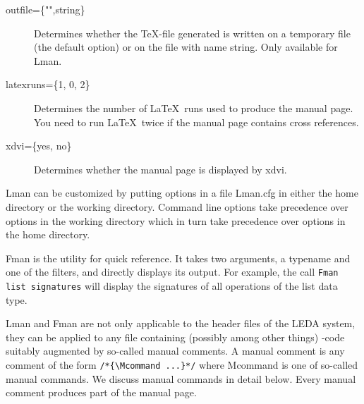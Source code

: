 \begin{description}
\item[outfile=\{"",string\}] Determines whether the \TeX-file generated
is written on a temporary file (the default option) or on the file with name
string. Only available for Lman.

\item[latexruns=\{1, 0, 2\}] Determines the number of \LaTeX\  runs 
used to produce the manual page. You need to run \LaTeX\ twice if the manual
page contains cross references.

\item[xdvi=\{yes, no\}] Determines whether the manual page is 
displayed by xdvi.
\end{description}

Lman can be customized by putting options in a file Lman.cfg in either the home
directory or the working directory. Command line options take precedence over
options in the working directory which in turn take precedence over options in
the home directory.

Fman is the utility for quick reference. It takes two arguments, a typename and
one of the filters, and directly displays its output. For example, the call
\texttt{Fman list signatures} will display the signatures of all operations of
the list data type.

Lman and Fman are not only applicable to the header files of the LEDA system,
they can be applied to any file containing (possibly among other things)
\CCC-code suitably augmented by so-called manual comments. A manual comment is
any comment of the form \verb|/*{\Mcommand ...}*/| where Mcommand is one of
so-called manual commands. We discuss manual commands in detail below.  Every
manual comment produces part of the manual page. 

